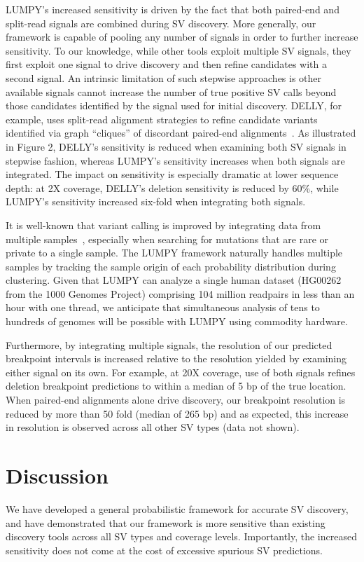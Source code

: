 \documentclass[10pt]{bmc_article}
\newenvironment{bmcformat}{\begin{raggedright}\baselineskip20pt\sloppy\setboolean{publ}{false}}{\end{raggedright}\baselineskip20pt\sloppy}
\begin{document}
\begin{bmcformat}
LUMPY's increased sensitivity is driven by the fact that both paired-end and
split-read signals are combined during SV discovery. More generally, our
framework is capable of pooling any number of signals in order to further
increase sensitivity. To our knowledge, while other tools exploit multiple SV
signals, they first exploit one signal to drive discovery and then refine
candidates with a second signal. An intrinsic limitation of such stepwise
approaches is other available signals cannot increase the number of true
positive SV calls beyond those candidates identified by the signal used for
initial discovery. DELLY, for example, uses split-read alignment strategies to
refine candidate variants identified via graph ``cliques'' of discordant
paired-end alignments~\cite{rausch2012b}. As illustrated in Figure 2, DELLY's
sensitivity is reduced when examining both SV signals in stepwise fashion,
whereas LUMPY's sensitivity increases when both signals are integrated. The
impact on sensitivity is especially dramatic at lower sequence depth: at 2X
coverage, DELLY's deletion sensitivity is reduced by 60\%, while LUMPY's
sensitivity increased six-fold when integrating both signals.

It is well-known that variant calling is improved by integrating data from
multiple samples~\cite{handsaker2011, mckenna2010, hormozdiari2011,
quinlan2011}, especially when searching for mutations that are rare or private
to a single sample. The LUMPY framework naturally handles multiple samples by
tracking the sample origin of each probability distribution during clustering.
Given that LUMPY can analyze a single human dataset (HG00262 from the 1000
Genomes Project) comprising 104 million readpairs in less than an hour with one
thread, we anticipate that simultaneous analysis of tens to hundreds of genomes
will be possible with LUMPY using commodity hardware.

Furthermore, by integrating multiple signals, the resolution of our
predicted breakpoint intervals is increased relative to the resolution yielded
by examining either signal on its own. For example, at 20X coverage, use of both
signals refines deletion breakpoint predictions to within a median of 5 bp of
the true location. When paired-end alignments alone drive discovery, our
breakpoint resolution is reduced by more than 50 fold (median of 265 bp) and as
expected, this increase in resolution is observed across all other SV types
(data not shown).

\section*{Discussion}
We have developed a general probabilistic framework for accurate SV discovery,
and have demonstrated that our framework is more sensitive than existing
discovery tools across all SV types and coverage levels. Importantly, the
increased sensitivity does not come at the cost of excessive spurious SV
predictions.


\end{bmcformat}
\end{document}
